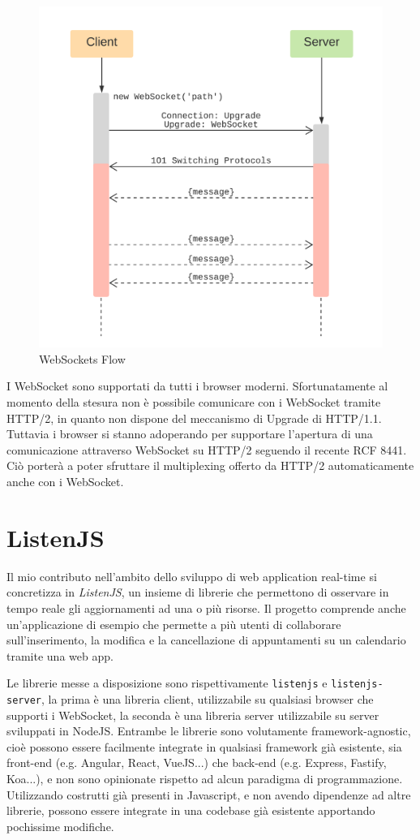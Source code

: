 \documentclass[12pt,a4paper,openright,twoside]{report}
\begin{document}
\begin{figure}[!htbp]
\centering
\includegraphics[width=.5\textwidth]{assets/websockets.png}
\caption{WebSockets Flow}
\label{fig:websockets}
\end{figure}
I WebSocket sono supportati da tutti i browser moderni. 
Sfortunatamente al momento della stesura non è possibile comunicare con i WebSocket tramite HTTP/2, in quanto non dispone del meccanismo di Upgrade di HTTP/1.1. Tuttavia i browser si stanno adoperando per supportare l'apertura di una comunicazione attraverso WebSocket su HTTP/2 seguendo il recente RCF 8441\cite{websockets_http2_rfc}. Ciò porterà a poter sfruttare il multiplexing offerto da HTTP/2 automaticamente anche con i WebSocket.
\chapter{ListenJS}
Il mio contributo nell'ambito dello sviluppo di web application real-time si concretizza in \textit{ListenJS}, un insieme di librerie che permettono di osservare in tempo reale gli aggiornamenti ad una o più risorse.
Il progetto comprende anche un'applicazione di esempio che permette a più utenti di collaborare sull'inserimento, la modifica e la cancellazione di appuntamenti su un calendario tramite una web app.

\bigskip

Le librerie messe a disposizione sono rispettivamente \lstinline{listenjs} e \lstinline{listenjs-server}, la prima è una libreria client, utilizzabile su qualsiasi browser che supporti i WebSocket, la seconda è una libreria server utilizzabile su server sviluppati in NodeJS.
Entrambe le librerie sono volutamente framework-agnostic, cioè possono essere facilmente integrate in qualsiasi framework già esistente, sia front-end (e.g. Angular, React, VueJS...) che back-end (e.g. Express, Fastify, Koa...), e non sono opinionate rispetto ad alcun paradigma di programmazione. Utilizzando costrutti già presenti in Javascript, e non avendo dipendenze ad altre librerie, possono essere integrate in una codebase già esistente apportando pochissime modifiche.
\end{document}
